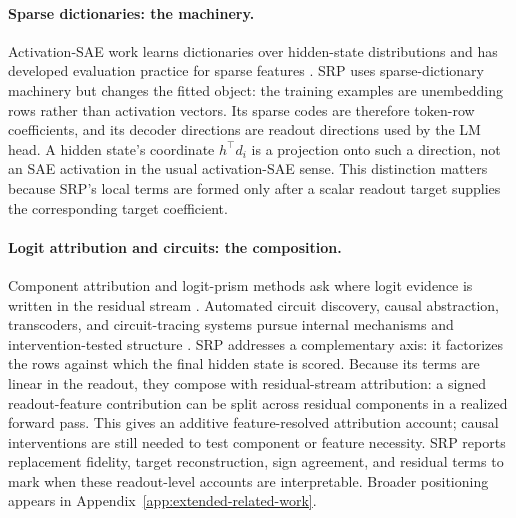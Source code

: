 \paragraph{Sparse dictionaries: the machinery.}
Activation-SAE work learns dictionaries over hidden-state distributions and has
developed evaluation practice for sparse features
\citep{bricken2023monosemanticity,cunningham2023sparse,gao2024scaling,karvonen2025saebench,makelov2024principled}.
SRP uses sparse-dictionary machinery but changes the fitted object: the training
examples are unembedding rows rather than activation vectors. Its sparse codes
are therefore token-row coefficients, and its decoder directions are readout
directions used by the LM head. A hidden state's coordinate \(h^\top d_i\) is a
projection onto such a direction, not an SAE activation in the usual
activation-SAE sense. This distinction matters because SRP's local terms are
formed only after a scalar readout target supplies the corresponding target
coefficient.

\paragraph{Logit attribution and circuits: the composition.}
Component attribution and logit-prism methods ask where logit evidence is
written in the residual stream
\citep{elhage2021framework,wang2022ioi,nguyen2024logitprisms}. Automated circuit
discovery, causal abstraction, transcoders, and circuit-tracing systems pursue
internal mechanisms and intervention-tested structure
\citep{conmy2023acdc,geiger2023causalabstraction,dunefsky2024transcoders,ameisen2025circuittracing}.
SRP addresses a complementary axis: it factorizes the rows against which the
final hidden state is scored. Because its terms are linear in the readout, they
compose with residual-stream attribution: a signed readout-feature contribution
can be split across residual components in a realized forward pass. This gives
an additive feature-resolved attribution account; causal interventions are still
needed to test component or feature necessity. SRP reports replacement fidelity,
target reconstruction, sign agreement, and residual terms to mark when these
readout-level accounts are interpretable. Broader positioning appears in
Appendix~\ref{app:extended-related-work}.
